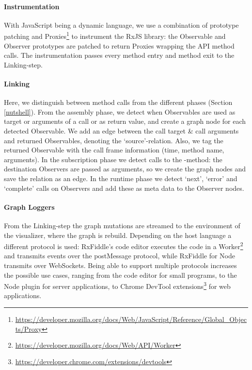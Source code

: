 \paragraph{Instrumentation}
With JavaScript being a dynamic language, we use a combination of prototype patching and Proxies\footnote{\url{https://developer.mozilla.org/docs/Web/JavaScript/Reference/Global_Objects/Proxy}} to instrument the RxJS library: the Observable and Observer prototypes are patched to return Proxies wrapping the API method calls. The instrumentation passes every method entry and method exit to the Linking-step.

\paragraph{Linking}
Here, we distinguish between method calls from the different phases (Section \ref{nutshell}). From the assembly phase, we detect when Observables are used as target or arguments of a call or as return value, and create a graph node for each detected Observable. We add an edge between the call target \& call arguments and returned Observables, denoting the `source'-relation. Also, we tag the returned Observable with the call frame information (time, method name, arguments). In the subscription phase we detect calls to the -method: the destination Observers are passed as arguments, so we create the graph nodes and save the relation as an edge. In the runtime phase we detect `next', `error' and `complete' calls on Observers and add these as meta data to the Observer nodes.

\paragraph{Graph Loggers}
From the Linking-step the graph mutations are streamed to the environment of the visualizer, where the graph is rebuild. Depending on the host language a different protocol is used: RxFiddle's code editor executes the code in a Worker\footnote{\url{https://developer.mozilla.org/docs/Web/API/Worker}} and transmits events over the postMessage protocol, while RxFiddle for Node transmits over WebSockets. Being able to support multiple protocols increases the possible use cases, ranging from the code editor for small programs, to the Node plugin for server applications, to Chrome DevTool extensions\footnote{\url{https://developer.chrome.com/extensions/devtools}} for web applications.

